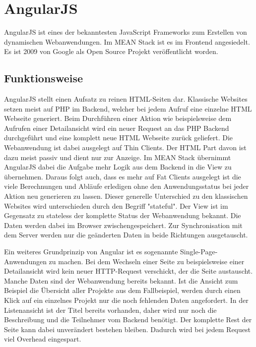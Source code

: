 \chapter{AngularJS}
\label{angularjs}

AngularJS ist eines der bekanntesten JavaScript Frameworks zum Erstellen von dynamischen Webanwendungen. Im MEAN Stack ist es im Frontend angesiedelt. Es ist 2009 von Google als Open Source Projekt veröffentlicht worden. 

\section{Funktionsweise}
AngularJS stellt einen Aufsatz zu reinen HTML-Seiten dar. 
Klassische Websites setzen meist auf PHP im Backend, welcher bei jedem Aufruf eine einzelne HTML Webseite generiert.
Beim Durchführen einer Aktion wie beispielsweise dem Aufrufen einer Detailansicht wird ein neuer Request an das PHP Backend durchgeführt und eine komplett neue HTML Webseite zurück geliefert.
Die Webanwendung ist dabei ausgelegt auf Thin Clients.
Der HTML Part davon ist dazu meist passiv und dient nur zur Anzeige.
Im MEAN Stack übernimmt AngularJS dabei die Aufgabe mehr Logik aus dem Backend in die View zu übernehmen.
Daraus folgt auch, dass es mehr auf Fat Clients ausgelegt ist die viele Berechnungen und Abläufe erledigen ohne den Anwendungsstatus bei jeder Aktion neu generieren zu lassen.
Dieser generelle Unterschied zu den klassischen Websites wird unterschieden durch den Begriff "stateful".
Der View ist im Gegensatz zu stateless der komplette Status der Webanwendung bekannt.
Die Daten werden dabei im Browser zwischengespeichert.
Zur Synchronisation mit dem Server werden nur die geänderten Daten in beide Richtungen ausgetauscht.

Ein weiteres Grundprinzip von Angular ist es sogenannte Single-Page-Anwendungen zu machen.
Bei dem Wechseln einer Seite zu beispielsweise einer Detailansicht wird kein neuer HTTP-Request verschickt, der die Seite austauscht.
Manche Daten sind der Webanwendung bereits bekannt.
Ist die Ansicht zum Beispiel die Übersicht aller Projekte aus dem Fallbeispiel, werden durch einen Klick auf ein einzelnes Projekt nur die noch fehlenden Daten angefordert.
In der Listenansicht ist der Titel bereits vorhanden, daher wird nur noch die Beschreibung und die Teilnehmer vom Backend benötigt.
Der komplette Rest der Seite kann dabei unverändert bestehen bleiben.
Dadurch wird bei jedem Request viel Overhead eingespart.

